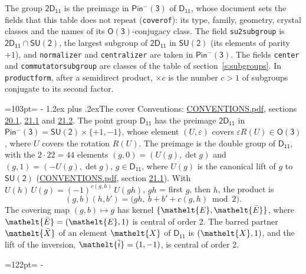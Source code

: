 \documentclass[10pt,a4paper]{article}
\makeatletter
\renewcommand\section{\@startsection{section}{1}{\z@}{-3ex plus -1ex minus -.2ex}%
  {1.2ex plus .2ex}{\normalfont\large\sffamily\bfseries\color{parttitle}}}
\newcommand{\needspace}[1]{\par\penalty-100\begingroup\dimen0=#1\relax\dimen2=\pagegoal
  \advance\dimen2-\pagetotal\ifdim\dimen0>\dimen2\relax\ifdim\dimen2>0pt\vfil\break\fi\fi
  \endgroup}
\numberwithin{equation}{section}
\newcommand{\eltfont}[1]{{\let\sigma\eltsigma\mathelt{#1}}}
\newcommand{\grp}[1]{\mathsf{#1}}
\newcommand{\elt}[1]{\eltfont{#1}}
\newcommand{\dirprod}{\times}
\newcommand{\barred}[1]{\bar{#1}}
\newcommand{\lift}[1]{\tilde{#1}}
\makeatother
\begin{document}
\leavevmode\label{n:element.inversion}\label{n:group.preimage}The group $\grp{2D_{11}}$ is the preimage in $\grp{Pin^{-}(3)}$ of \href{../../../rotation/data/pdf/D11.pdf}{$\grp{D_{11}}$}, whose document sets the fields that this table does not repeat (\texttt{coverof}): its type, family, geometry, crystal classes and the names of its \href{../../../rotation/data/pdf/O3.pdf}{$\grp{O(3)}$}-conjugacy class. The field \texttt{su2subgroup} is $\grp{2D_{11}} \cap \grp{SU(2)}$, the largest subgroup of $\grp{2D_{11}}$ in $\grp{SU(2)}$ (its elements of parity $+1$), and \texttt{normalizer} and \texttt{centralizer} are taken in $\grp{Pin^{-}(3)}$. The fields \texttt{center} and \texttt{commutatorsubgroup} are classes of the table of section~\ref{s:subgroups}.
\leavevmode\label{n:index.conjugates.c}In \texttt{productform}, after a semidirect product, ${\times}c$ is the number $c > 1$ of subgroups conjugate to its second factor.
\needspace{103pt}
\section{The cover}\label{s:cover}
Conventions: \href{../../CONVENTIONS.pdf}{CONVENTIONS.pdf}, sections \href{../../CONVENTIONS.pdf\#conv.20.1}{20.1}, \href{../../CONVENTIONS.pdf\#conv.21.1}{21.1} and \href{../../CONVENTIONS.pdf\#conv.21.2}{21.2}.
\leavevmode\label{n:group.pin.minus}\label{n:group.su2}\label{n:local.pin.sign}\label{n:matrix.covered}\label{n:matrix.lift.su2}\label{n:index.bar}The point group $\grp{D_{11}}$ has the preimage $\grp{2D_{11}}$ in $\grp{Pin^{-}(3)} = \grp{SU(2)} \dirprod \{+1, -1\}$, whose element $(U, \varepsilon)$ covers $\varepsilon R(U) \in \grp{O(3)}$, where $U$ covers the rotation $R(U)$. The preimage is the double group of $\grp{D_{11}}$, with the $2 \cdot 22 = 44$ elements $(g, 0) = (U(g), \det g)$ and $(g, 1) = (-U(g), \det g)$, $g \in \grp{D_{11}}$, where $U(g)$ is the canonical lift of $g$ to $\grp{SU(2)}$ (\href{../../CONVENTIONS.pdf}{CONVENTIONS.pdf}, section \href{../../CONVENTIONS.pdf\#conv.21.1}{21.1}). \label{n:function.cocycle}With $U(h)\,U(g) = (-1)^{c(g,h)}\,U(gh)$, $gh$ = first $g$, then $h$, the product is
\begin{equation}\label{e:product}(g, b)(h, b') = \bigl(gh,\ b + b' + c(g, h) \bmod 2\bigr).\end{equation}
\leavevmode\label{n:mark.bar}The covering map $(g, b) \mapsto g$ has kernel $\{\elt{E}, \elt{\barred{E}}\}$, where $\elt{\barred{E}} = (\elt{E}, 1)$ is central of order 2. \label{n:element.named}\label{n:mark.lift}The barred partner $\elt{\barred{X}}$ of an element $\elt{X}$ of $\grp{D_{11}}$ is $(\elt{X}, 1)$, and the lift of the inversion, $\elt{\lift{i}} = (1, -1)$, is central of order 2.
\needspace{122pt}
\end{document}
